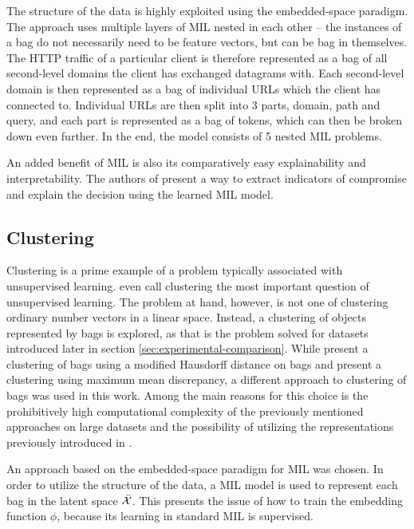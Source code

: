The structure of the data is highly exploited using the embedded-space paradigm. The approach uses multiple layers of MIL nested in each other -- the instances of a bag do not necessarily need to be feature vectors, but can be bag in themselves. The HTTP traffic of a particular client is therefore represented as a bag of all second-level domains the client has exchanged datagrams with. Each second-level domain is then represented as a bag of individual URLs which the client has connected to. Individual URLs are then split into 3 parts, domain, path and query, and each part is represented as a bag of tokens, which can then be broken down even further. In the end, the model consists of 5 nested MIL problems.

An added benefit of MIL is also its comparatively easy explainability and interpretability. The authors of \cite{pevny_nested_2020} present a way to extract indicators of compromise and explain the decision using the learned MIL model.

\subsection{Clustering}
Clustering is a prime example of a problem typically associated with unsupervised learning. \cite{xu_comprehensive_2015} even call clustering the most important question of unsupervised learning. The problem at hand, however, is not one of clustering ordinary number vectors in a linear space. Instead, a clustering of objects represented by bags is explored, as that is the problem solved for datasets introduced later in section \ref{sec:experimental-comparison}. While \cite{wang_solving_2000} present a clustering of bags using a modified Hausdorff distance on bags and \cite{kohout_network_2018} present a clustering using maximum mean discrepancy, a different approach to clustering of bags was used in this work. Among the main reasons for this choice is the prohibitively high computational complexity of the previously mentioned approaches on large datasets and the possibility of utilizing the representations previously introduced in \cite{pevny_nested_2020}.

An approach based on the embedded-space paradigm for MIL was chosen. In order to utilize the structure of the data, a MIL model is used to represent each bag in the latent space \( \bar{\mathcal{X}} \). This presents the issue of how to train the embedding function \( \phi \), because its learning in standard MIL is supervised.

